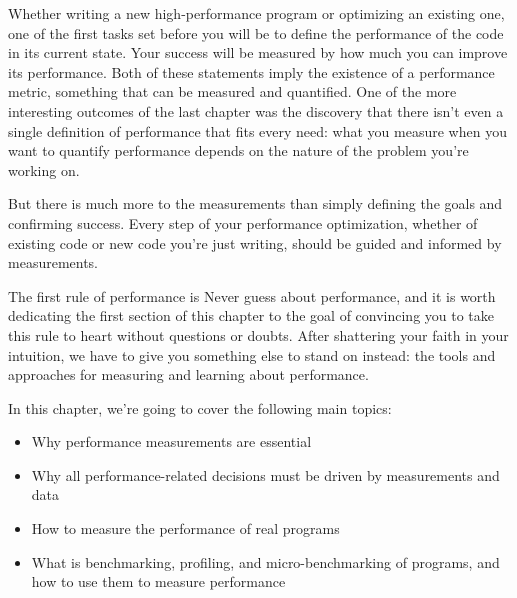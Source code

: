 Whether writing a new high-performance program or optimizing an existing one, one of the first tasks set before you will be to define the performance of the code in its current state. Your success will be measured by how much you can improve its performance. Both of these statements imply the existence of a performance metric, something that can be measured and quantified. One of the more interesting outcomes of the last chapter was the discovery that there isn't even a single definition of performance that fits every need: what you measure when you want to quantify performance depends on the nature of the problem you're working on.

But there is much more to the measurements than simply defining the goals and confirming success. Every step of your performance optimization, whether of existing code or new code you're just writing, should be guided and informed by measurements.

The first rule of performance is Never guess about performance, and it is worth dedicating the first section of this chapter to the goal of convincing you to take this rule to heart without questions or doubts. After shattering your faith in your intuition, we have to give you something else to stand on instead: the tools and approaches for measuring and learning about performance.

In this chapter, we're going to cover the following main topics:

\begin{itemize}
\item Why performance measurements are essential
\item Why all performance-related decisions must be driven by measurements and data
\item How to measure the performance of real programs
\item What is benchmarking, profiling, and micro-benchmarking of programs, and how to use them to measure performance
\end{itemize}

